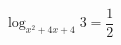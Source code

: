 \begin{ex}[type=equation]
	\begin{condition}
		$\log_{x^2 + 4x + 4} 3 = \dfrac{1}{2}$
	\end{condition}
\end{ex}